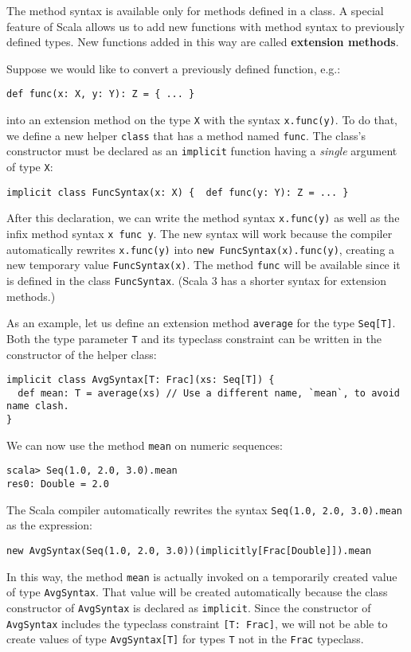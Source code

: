 The method syntax is available only for methods defined in a class.
A special feature of Scala allows us to add new functions with method
syntax to previously defined types. New functions added in this way
are called \textbf{extension methods}. 

Suppose we would like to convert a previously defined function, e.g.:
\begin{lstlisting}
def func(x: X, y: Y): Z = { ... }
\end{lstlisting}
into an extension method on the type \lstinline!X! with the syntax
\lstinline!x.func(y)!. To do that, we define a new helper \lstinline!class!
that has a method named \lstinline!func!. The class\textsf{'}s constructor
must be declared as an \lstinline!implicit! function having a \emph{single}
argument of type \lstinline!X!:
\begin{lstlisting}
implicit class FuncSyntax(x: X) {  def func(y: Y): Z = ... }
\end{lstlisting}
After this declaration, we can write the method syntax \lstinline!x.func(y)!
as well as the infix method syntax \lstinline!x func y!. The new
syntax will work because the compiler automatically rewrites \lstinline!x.func(y)!
into \lstinline!new FuncSyntax(x).func(y)!, creating a new temporary
value \lstinline!FuncSyntax(x)!. The method \lstinline!func! will
be available since it is defined in the class \lstinline!FuncSyntax!.
(Scala 3 has a shorter syntax for extension methods.)

As an example, let us define an extension method \lstinline!average!
for the type \lstinline!Seq[T]!. Both the type parameter \lstinline!T!
and its typeclass constraint can be written in the constructor of
the helper class:
\begin{lstlisting}
implicit class AvgSyntax[T: Frac](xs: Seq[T]) {
  def mean: T = average(xs) // Use a different name, `mean`, to avoid name clash.
}
\end{lstlisting}
We can now use the method \lstinline!mean! on numeric sequences:
\begin{lstlisting}
scala> Seq(1.0, 2.0, 3.0).mean
res0: Double = 2.0
\end{lstlisting}
The Scala compiler automatically rewrites the syntax \lstinline!Seq(1.0, 2.0, 3.0).mean!
as the expression:
\begin{lstlisting}
new AvgSyntax(Seq(1.0, 2.0, 3.0))(implicitly[Frac[Double]]).mean
\end{lstlisting}
In this way, the method \lstinline!mean! is actually invoked on a
temporarily created value of type \lstinline!AvgSyntax!. That value
will be created automatically because the class constructor of \lstinline!AvgSyntax!
is declared as \lstinline!implicit!. Since the constructor of \lstinline!AvgSyntax!
includes the typeclass constraint \lstinline![T: Frac]!, we will
not be able to create values of type \lstinline!AvgSyntax[T]! for
types \lstinline!T! not in the \lstinline!Frac! typeclass.

